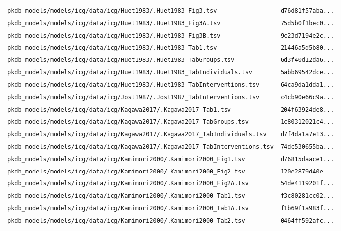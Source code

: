 \documentclass{article}
\begin{document}
\begin{longtable}{ll}
\texttt{pkdb\_models/models/icg/data/icg/Huet1983/.Huet1983\_Fig3.tsv} & \texttt{d76d81f57aba...} \\
\texttt{pkdb\_models/models/icg/data/icg/Huet1983/.Huet1983\_Fig3A.tsv} & \texttt{75d5b0f1bec0...} \\
\texttt{pkdb\_models/models/icg/data/icg/Huet1983/.Huet1983\_Fig3B.tsv} & \texttt{9c23d7194e2c...} \\
\texttt{pkdb\_models/models/icg/data/icg/Huet1983/.Huet1983\_Tab1.tsv} & \texttt{21446a5d5b80...} \\
\texttt{pkdb\_models/models/icg/data/icg/Huet1983/.Huet1983\_TabGroups.tsv} & \texttt{6d3f40d12da6...} \\
\texttt{pkdb\_models/models/icg/data/icg/Huet1983/.Huet1983\_TabIndividuals.tsv} & \texttt{5abb69542dce...} \\
\texttt{pkdb\_models/models/icg/data/icg/Huet1983/.Huet1983\_TabInterventions.tsv} & \texttt{64ca9da1dda1...} \\
\texttt{pkdb\_models/models/icg/data/icg/Jost1987/.Jost1987\_TabInterventions.tsv} & \texttt{c4cb90e66c9a...} \\
\texttt{pkdb\_models/models/icg/data/icg/Kagawa2017/.Kagawa2017\_Tab1.tsv} & \texttt{204f63924de8...} \\
\texttt{pkdb\_models/models/icg/data/icg/Kagawa2017/.Kagawa2017\_TabGroups.tsv} & \texttt{1c80312021c4...} \\
\texttt{pkdb\_models/models/icg/data/icg/Kagawa2017/.Kagawa2017\_TabIndividuals.tsv} & \texttt{d7f4da1a7e13...} \\
\texttt{pkdb\_models/models/icg/data/icg/Kagawa2017/.Kagawa2017\_TabInterventions.tsv} & \texttt{74dc530655ba...} \\
\texttt{pkdb\_models/models/icg/data/icg/Kamimori2000/.Kamimori2000\_Fig1.tsv} & \texttt{d76815daace1...} \\
\texttt{pkdb\_models/models/icg/data/icg/Kamimori2000/.Kamimori2000\_Fig2.tsv} & \texttt{120e2879d40e...} \\
\texttt{pkdb\_models/models/icg/data/icg/Kamimori2000/.Kamimori2000\_Fig2A.tsv} & \texttt{54de4119201f...} \\
\texttt{pkdb\_models/models/icg/data/icg/Kamimori2000/.Kamimori2000\_Tab1.tsv} & \texttt{f3c80281cc02...} \\
\texttt{pkdb\_models/models/icg/data/icg/Kamimori2000/.Kamimori2000\_Tab1A.tsv} & \texttt{f1b69f1a983f...} \\
\texttt{pkdb\_models/models/icg/data/icg/Kamimori2000/.Kamimori2000\_Tab2.tsv} & \texttt{0464ff592afc...} \\

\end{longtable}
\end{document}
